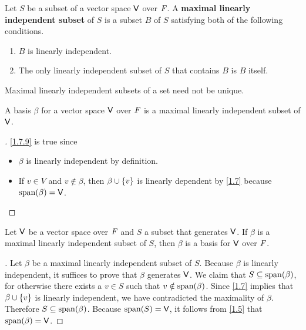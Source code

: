 \begin{defn}\label{1.7.8}
  Let \(S\) be a subset of a vector space \(\mathsf{V}\) over \(\mathit{F}\).
  A \textbf{maximal linearly independent subset} of \(S\) is a subset \(B\) of \(S\) satisfying both of the following conditions.
  \begin{enumerate}
    \item \(B\) is linearly independent.
    \item The only linearly independent subset of \(S\) that contains \(B\) is \(B\) itself.
  \end{enumerate}
\end{defn}

\begin{note}
  Maximal linearly independent subsets of a set need not be unique.
\end{note}

\begin{eg}\label{1.7.9}
  A basis \(\beta\) for a vector space \(\mathsf{V}\) over \(\mathit{F}\) is a maximal linearly independent subset of \(\mathsf{V}\).
\end{eg}

\begin{proof}[]
  \cref{1.7.9} is true since
  \begin{itemize}
    \item \(\beta\) is linearly independent by definition.
    \item If \(v \in V\) and \(v \notin \beta\), then \(\beta \cup \left\lbrace v\right\rbrace\) is linearly dependent by \cref{1.7} because \(\spn{\beta} = \V\).
  \end{itemize}
\end{proof}

\begin{thm}\label{1.12}
  Let \(\mathsf{V}\) be a vector space over \(\mathit{F}\) and \(S\) a subset that generates \(\mathsf{V}\).
  If \(\beta\) is a maximal linearly independent subset of \(S\), then \(\beta\) is a basis for \(\mathsf{V}\) over \(\mathit{F}\).
\end{thm}

\begin{proof}[]
  Let \(\beta\) be a maximal linearly independent subset of \(S\).
  Because \(\beta\) is linearly independent, it suffices to prove that \(\beta\) generates \(\mathsf{V}\).
  We claim that \(S \subseteq \spn{\beta}\), for otherwise there exists a \(v \in S\) such that \(v \notin \spn{\beta}\).
  Since \cref{1.7} implies that \(\beta \cup \left\lbrace v\right\rbrace\) is linearly independent, we have contradicted the maximality of \(\beta\).
  Therefore \(S \subseteq \spn{\beta}\).
  Because \(\spn{S} = \V\), it follows from \cref{1.5} that \(\spn{\beta} = \V\).
\end{proof}

